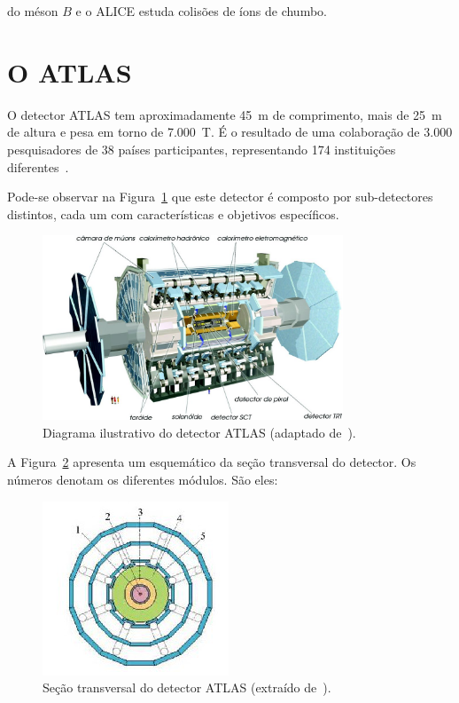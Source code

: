 do méson $B$ e o ALICE estuda colisões de íons de chumbo.


\section{O ATLAS}

O detector ATLAS tem aproximadamente 45~m de comprimento, mais de 25~m de altura
e pesa em torno de 7.000~T. É o resultado de uma colaboração de 3.000
pesquisadores de 38 países participantes, representando 174 instituições
diferentes~\cite{ref:atlas_factsheet}\cite{GRAEL2011}.

Pode-se observar na Figura~\ref{fig:atlasschema} que este detector é composto
por sub-detectores distintos, cada um com características e
objetivos específicos.

\begin{figure}[H]
    \centering
    \includegraphics[width=0.8\textwidth]{images/ATLAS_esquema.png}
    \caption[Diagrama ilustrativo do detector ATLAS.]{Diagrama ilustrativo do
    detector ATLAS (adaptado de~\cite{ref:atlas_www}).}
    \label{fig:atlasschema}
\end{figure}

A Figura~\ref{fig:atlassection} apresenta um esquemático da seção transversal do
detector. Os números denotam os diferentes módulos. São eles:

\begin{figure}[H]
    \centering
    \includegraphics{images/atlas_transversal.png}
    \caption[Seção transversal do detector ATLAS.]{Seção transversal do detector
    ATLAS (extraído de~\cite{ref:TORRES}).}
    \label{fig:atlassection}
\end{figure}


